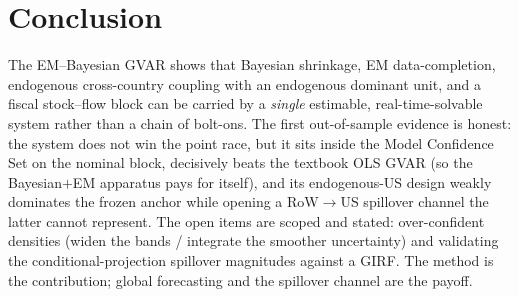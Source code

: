 \documentclass[11pt]{article}
\begin{document}
\section{Conclusion}

The EM--Bayesian GVAR shows that Bayesian shrinkage, EM data-completion, endogenous cross-country
coupling with an endogenous dominant unit, and a fiscal stock--flow block can be carried by a
\emph{single} estimable, real-time-solvable system rather than a chain of bolt-ons. The first
out-of-sample evidence is honest: the system does not win the point race, but it sits inside the Model
Confidence Set on the nominal block, decisively beats the textbook OLS GVAR (so the Bayesian$+$EM
apparatus pays for itself), and its endogenous-US design weakly dominates the frozen anchor while opening
a RoW$\to$US spillover channel the latter cannot represent. The open items are scoped and stated:
over-confident densities (widen the bands / integrate the smoother uncertainty) and validating the
conditional-projection spillover magnitudes against a GIRF. The method is the contribution; global
forecasting and the spillover channel are the payoff.



\end{document}
